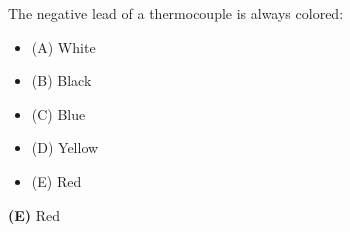 

The negative lead of a thermocouple is always colored:

\begin{itemize}
\item{(A)} White
\vskip 5pt 
\item{(B)} Black
\vskip 5pt 
\item{(C)} Blue
\vskip 5pt 
\item{(D)} Yellow
\vskip 5pt 
\item{(E)} Red
\end{itemize}







{\bf (E)} Red
 









